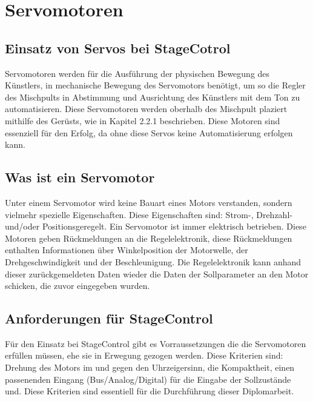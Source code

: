 \section{Servomotoren}
\subsection{Einsatz von Servos bei StageCotrol}
Servomotoren werden für die Ausführung der physischen Bewegung des Künstlers, in mechanische Bewegung des Servomotors benötigt, um so die Regler des Mischpults in Abstimmung und Ausrichtung des Künstlers mit dem Ton zu automatisieren. Diese Servomotoren werden oberhalb des Mischpult plaziert mithilfe des Gerüsts, wie in Kapitel 2.2.1 beschrieben. Diese Motoren sind essenziell für den Erfolg, da ohne diese Servos keine Automatisierung erfolgen kann.

\subsection{Was ist ein Servomotor}
Unter einem Servomotor wird keine Bauart eines Motors verstanden, sondern vielmehr spezielle Eigenschaften. Diese Eigenschaften sind: Strom-, Drehzahl- und/oder Positionsgeregelt. Ein Servomotor ist immer elektrisch betrieben. Diese Motoren geben Rückmeldungen an die Regelelektronik, diese Rückmeldungen enthalten Informationen über Winkelposition der Motorwelle, der Drehgeschwindigkeit und der Beschleunigung. Die Regelelektronik kann anhand dieser zurückgemeldeten Daten wieder die Daten der Sollparameter an den Motor schicken, die zuvor eingegeben wurden. \\
\cite{Servomotor_Info}

\subsection{Anforderungen für StageControl}
Für den Einsatz bei StageControl gibt es Vorraussetzungen die die Servomotoren erfüllen müssen, ehe sie in Erwegung gezogen werden. Diese Kriterien sind: Drehung des Motors im und gegen den Uhrzeigersinn, die Kompaktheit, einen passenenden Eingang (Bus/Analog/Digital) für die Eingabe der Sollzustände und. Diese Kriterien sind essentiell für die Durchführung dieser Diplomarbeit.

